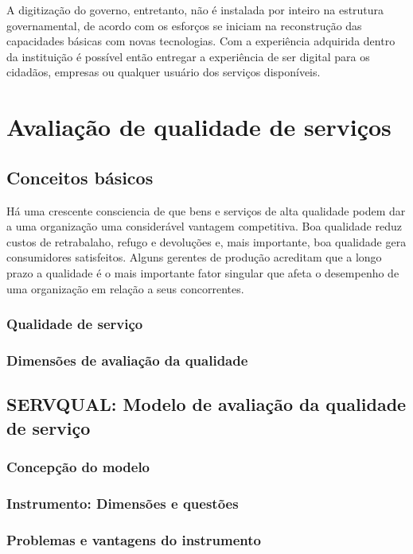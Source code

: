 A digitização do governo, entretanto, não é instalada por inteiro na estrutura governamental, de acordo com \cite{mckinsey2016} os esforços se iniciam na reconstrução das capacidades básicas com novas tecnologias. Com a experiência adquirida dentro da instituição é possível então entregar a experiência de ser digital para os cidadãos, empresas ou qualquer usuário dos serviços disponíveis.

\section{Avaliação de qualidade de serviços}
\subsection{Conceitos básicos}

Há uma crescente consciencia de que bens e serviços de alta qualidade podem dar a uma organização uma considerável vantagem competitiva. Boa qualidade reduz custos de retrabalaho, refugo e devoluções e, mais importante, boa qualidade gera consumidores satisfeitos. Alguns gerentes de produção acreditam que a longo prazo a qualidade é o mais importante fator singular que afeta o desempenho de uma organização em relação a seus concorrentes. \cite[p.~150]{slack2002}


\subsubsection{Qualidade de serviço}
\subsubsection{Dimensões de avaliação da qualidade}

\subsection{SERVQUAL: Modelo de avaliação da qualidade de serviço}
\subsubsection{Concepção do modelo}
\subsubsection{Instrumento: Dimensões e questões}
\subsubsection{Problemas e vantagens do instrumento}

